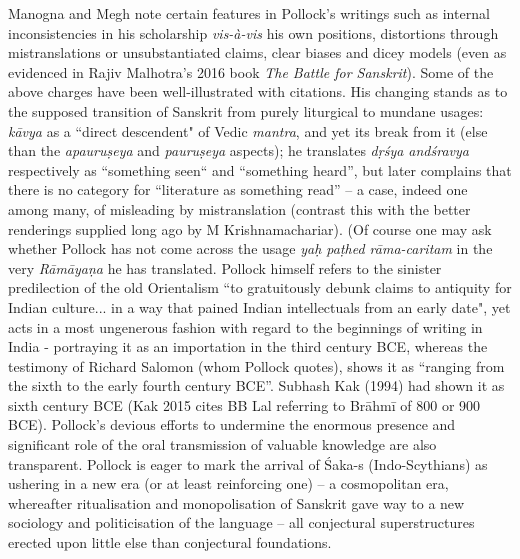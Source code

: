 Manogna and Megh note certain features in Pollock’s writings such as internal inconsistencies in his scholarship \textit{vis-à-vis} his own positions, distortions through mistranslations or unsubstantiated claims, clear biases and dicey models (even as evidenced in Rajiv Malhotra’s 2016 book \textit{The Battle for Sanskrit}). Some of the above charges have been well-illustrated with citations. His changing stands as to the supposed transition of Sanskrit from purely liturgical to mundane usages: \textit{kāvya} as a ``direct descendent" of Vedic \textit{mantra}, and yet its break from it (else than the \textit{apauruṣeya} and \textit{pauruṣeya} aspects); he translates \textit{dṛśya andśravya} respectively as “something seen“ and “something heard”, but later complains that there is no category for “literature as something read” – a case, indeed one among many, of misleading by mistranslation (contrast this with the better renderings supplied long ago by M Krishnamachariar). (Of course one may ask whether Pollock has not come across the usage \textit{yaḥ paṭhed rāma-caritam} in the very \textit{Rāmāyaṇa} he has translated. Pollock himself refers to the sinister predilection of the old Orientalism “to gratuitously debunk claims to antiquity for Indian culture... in a way that pained Indian intellectuals from an early date", yet acts in a most ungenerous fashion with regard to the beginnings of writing in India - portraying it as an importation in the third century BCE, whereas the testimony of Richard Salomon (whom Pollock quotes), shows it as “ranging from the sixth to the early fourth century BCE”. Subhash Kak (1994) had shown it as sixth century BCE (Kak 2015 cites BB Lal referring to Brāhmī of 800 or 900 BCE). Pollock’s devious efforts to undermine the enormous presence and significant role of the oral transmission of valuable knowledge are also transparent. Pollock is eager to mark the arrival of Śaka-s (Indo-Scythians) as ushering in a new era (or at least reinforcing one) – a cosmopolitan era, whereafter ritualisation and monopolisation of Sanskrit gave way to a new sociology and politicisation of the language – all conjectural superstructures erected upon little else than conjectural foundations.

\vskip 3pt

